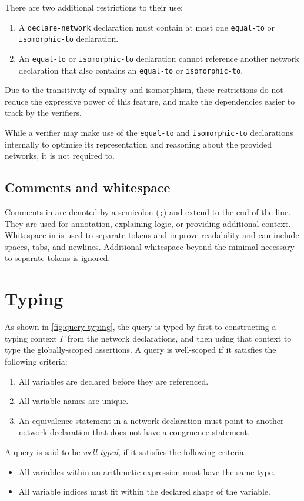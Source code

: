 There are two additional restrictions to their use:
\begin{enumerate}
\item A \texttt{declare-network} declaration must contain at most one \texttt{equal-to} or \texttt{isomorphic-to} declaration.
\item An \texttt{equal-to} or \texttt{isomorphic-to} declaration cannot reference another network declaration that also contains an \texttt{equal-to} or \texttt{isomorphic-to}. 
\end{enumerate}
Due to the transitivity of equality and isomorphism, these restrictions do not reduce the expressive power of this feature, and make the dependencies easier to track by the verifiers.

While a verifier may make use of the \texttt{equal-to} and \texttt{isomorphic-to} declarations internally to optimise its representation and reasoning about the provided networks, it is not required to.



\subsection{Comments and whitespace}

Comments in \vnnlib{} are denoted by a semicolon (\texttt{;}) and extend to the end of the line. They are used for annotation, explaining logic, or providing additional context. Whitespace in \vnnlib{} is used to separate tokens and improve readability and can include spaces, tabs, and newlines. Additional whitespace beyond the minimal necessary to separate tokens is ignored.


\section{Typing}

\label{sec:scoping_and_typing}
As shown in \autoref{fig:query-typing}, the query is typed by first to constructing a typing context $\Gamma$ from the network declarations, and then using that context to type the globally-scoped assertions.
A \vnnlib{} query is well-scoped if it satisfies the following criteria:
\begin{enumerate}
    \item All variables are declared before they are referenced.
    \item All variable names are unique.
    \item An equivalence statement in a network declaration must point to another network declaration that does not have a congruence statement.
\end{enumerate}
A \vnnlib{} query is said to be \textit{well-typed}, if it satisfies the following criteria.
\begin{itemize}
    \item All variables within an arithmetic expression must have the same type.
    \item All variable indices must fit within the declared shape of the variable.
\end{itemize}

